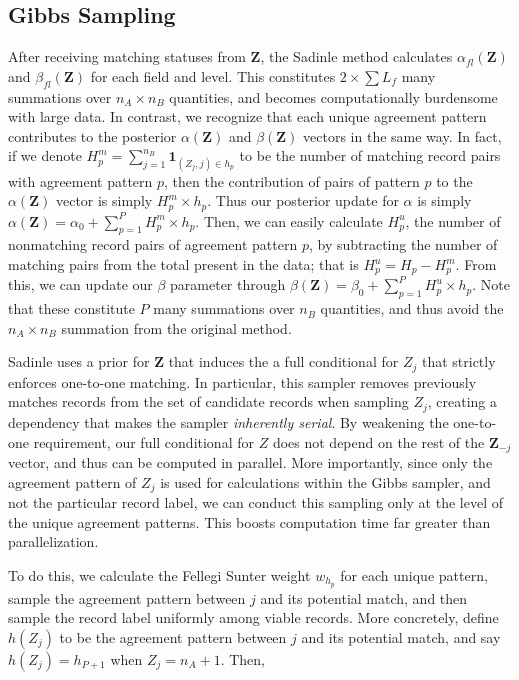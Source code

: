 \documentclass[
  12pt,
]{article}
\begin{document}
\hypertarget{gibbs-sampling}{%
\subsection{Gibbs Sampling}\label{gibbs-sampling}}

After receiving matching statuses from \(\mathbf{Z}\), the Sadinle
method calculates \(\alpha_{fl}(\mathbf{Z})\) and
\(\beta_{fl}(\mathbf{Z})\) for each field and level. This constitutes
\(2 \times \sum L_f\) many summations over \(n_A \times n_B\)
quantities, and becomes computationally burdensome with large data. In
contrast, we recognize that each unique agreement pattern contributes to
the posterior \(\alpha(\mathbf{Z})\) and \(\beta(\mathbf{Z})\) vectors
in the same way. In fact, if we denote
\(H_p^m = \sum_{j=1}^{n_B} \mathbf{1}_{(Z_j, j) \in h_p}\) to be the
number of matching record pairs with agreement pattern \(p\), then the
contribution of pairs of pattern \(p\) to the \(\alpha(\mathbf{Z})\)
vector is simply \(H_p^m \times h_p\). Thus our posterior update for
\(\alpha\) is simply
\(\alpha(\mathbf{Z}) = \alpha_0 + \sum_{p=1}^P H_p^m \times h_p\). Then,
we can easily calculate \(H_p^u\), the number of nonmatching record
pairs of agreement pattern \(p\), by subtracting the number of matching
pairs from the total present in the data; that is
\(H_p^u = H_p - H_p^m\). From this, we can update our \(\beta\)
parameter through
\(\beta(\mathbf{Z}) = \beta_0 + \sum_{p=1}^P H_p^u \times h_p\). Note
that these constitute \(P\) many summations over \(n_B\) quantities, and
thus avoid the \(n_A \times n_B\) summation from the original method.

Sadinle uses a prior for \(\mathbf{Z}\) that induces the a full
conditional for \(Z_j\) that strictly enforces one-to-one matching. In
particular, this sampler removes previously matches records from the set
of candidate records when sampling \(Z_j\), creating a dependency that
makes the sampler \emph{inherently serial}. By weakening the one-to-one
requirement, our full conditional for \(Z\) does not depend on the rest
of the \(\mathbf{Z}_{-j}\) vector, and thus can be computed in parallel.
More importantly, since only the agreement pattern of \(Z_j\) is used
for calculations within the Gibbs sampler, and not the particular record
label, we can conduct this sampling only at the level of the unique
agreement patterns. This boosts computation time far greater than
parallelization.

To do this, we calculate the Fellegi Sunter weight \(w_{h_p}\) for each
unique pattern, sample the agreement pattern between \(j\) and its
potential match, and then sample the record label uniformly among viable
records. More concretely, define \(h(Z_j)\) to be the agreement pattern
between \(j\) and its potential match, and say \(h(Z_j) = h_{P+1}\) when
\(Z_j = n_A + 1\). Then,
\end{document}
